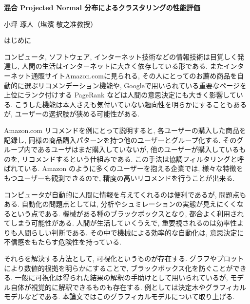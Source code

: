 \documentclass[a4j,11pt]{jarticle}
\makeatletter
\def\section{\@startsection{section}{1}{\z@}
   {0.8\Cvs \@plus.5\Cdp \@minus.2\Cdp}
   {0.2\Cvs \@plus.3\Cdp}
   {\normalfont \Large \bfseries}}
\makeatother
\begin{document}
%

\begin{center}
{\Large \textbf{混合 Projected Normal 分布によるクラスタリングの性能評価}}
\end{center}
\begin{flushright}
小坪 琢人（塩濱 敬之准教授）
\end{flushright}
\vspace{-3zh}


\section{はじめに}
\vspace{-0.5zh}

コンピュータ, ソフトウェア, インターネット技術などの情報技術は目覚しく発達し, 人間の生活はインターネットに大きく依存している形である. またインターネット通販サイトAmazon.comに見られる, その人にとってのお薦め商品を自動的に選ぶリコメンデーション機能や, Googleで用いられている重要なページを上位にランク付けする PageRank などは人間の意思決定にも大きく影響している. こうした機能は本人さえも気付いていない趣向性を明らかにすることもあるが, ユーザーの選択肢が狭める可能性がある.

Amazon.com リコメンドを例にとって説明すると, 各ユーザーの購入した商品を記録し, 同様の商品購入パターンを持つ他のユーザーとグループ化する. そのグループ内であるユーザはまだ購入していないが, 他のユーザーが購入しているものを, リコメンドするという仕組みである. この手法は協調フィルタリングと呼ばれている. Amazon のように多くのユーザーを抱える企業では, 様々な特徴をもつユーザーも観測できるので, 精度の高いリコメンドを行うことが出来る.

コンピュータが自動的に人間に情報を与えてくれるのは便利であるが, 問題点もある. 自動化の問題点としては, 分析やシュミレーションの実態が見えにくくなるという点である. 機械がある種のブラックボックスとなり, 都合よく利用されてしまう可能性がある. 人間が生活していくうえで, 重要視されるのは効率性よりも人間らしい判断である. その中で機械による効率的な自動化は, 意思決定に不信感をもたらす危険性を持っている.

それらを解決する方法として, 可視化というものが存在する. グラフやプロットにより数値的根拠を明らかにすることで, ブラックボックス化を防ぐことができる. 一般に可視化は得られた結果の解釈の手助けとして用いられているが, モデル自体が視覚的に解釈できるものも存在する. 例としては決定木やグラフィカルモデルなどである. 本論文ではこのグラフィカルモデルについて取り上げる. 
\end{document}

